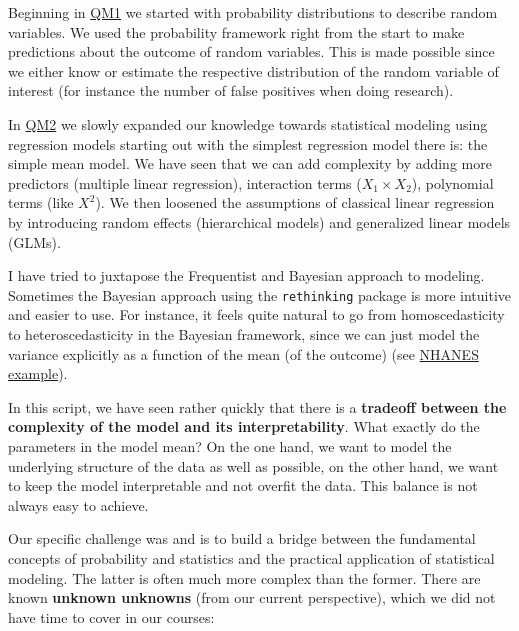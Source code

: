 \documentclass[
]{book}
\begin{document}
Beginning in \href{https://jdegenfellner.github.io/Script_QM1_ZHAW/}{QM1} we started
with probability distributions to describe random variables. We used the probability
framework right from the start to make predictions about the outcome of
random variables. This is made possible since we either know or estimate
the respective distribution of the random variable of interest (for instance the number of false positives
when doing research).

In \href{https://jdegenfellner.github.io/Script_QM2_ZHAW/index.html}{QM2} we slowly expanded
our knowledge towards statistical modeling using regression models starting out with the
simplest regression model there is: the simple mean model.
We have seen that we can add complexity by adding more predictors (multiple linear regression),
interaction terms (\(X_1 \times X_2\)), polynomial terms (like \(X^2\)).
We then loosened the assumptions of classical linear regression by introducing
random effects (hierarchical models) and generalized linear models (GLMs).

I have tried to juxtapose the Frequentist and Bayesian approach to modeling.
Sometimes the Bayesian approach using the \texttt{rethinking} package is more intuitive and easier to use.
For instance, it feels quite natural to go from homoscedasticity to heteroscedasticity
in the Bayesian framework, since we can just model the variance explicitly as a function of the mean (of the outcome)
(see \href{https://jdegenfellner.github.io/Script_QM2_ZHAW/multiple-linear-regression.html\#example_nhanes}{NHANES example}).

In this script, we have seen rather quickly that there is a \textbf{tradeoff between the complexity of
the model and its interpretability}. What exactly do the parameters in the model mean?
On the one hand, we want to model
the underlying structure of the data as well as possible,
on the other hand, we want to keep the model interpretable and not overfit the data.
This balance is not always easy to achieve.

Our specific challenge was and is to build a bridge between the fundamental concepts
of probability and statistics and the practical application of statistical modeling.
The latter is often much more complex than the former.
There are known \textbf{unknown unknowns} (from our current perspective), which we did not have time to cover in our courses:
\end{document}
